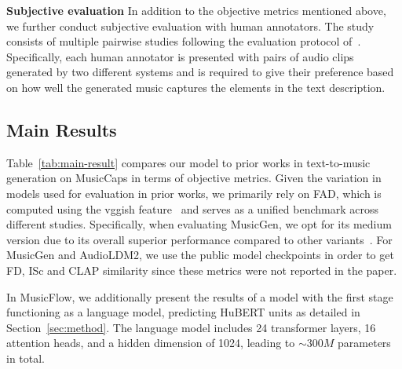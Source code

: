 
\textbf{Subjective evaluation} In addition to the objective metrics mentioned above, we further conduct subjective evaluation with human annotators. The study consists of multiple pairwise studies following the evaluation protocol of~\citet{musiclm}. Specifically, each human annotator is presented with pairs of audio clips generated by two different systems and is required to give their preference based on how well the generated music captures the elements in the text description. 

\subsection{Main Results}\label{sec:main-result}

Table~\ref{tab:main-result} compares our model to prior works in text-to-music generation on MusicCaps in terms of objective metrics. 
Given the variation in models used for evaluation in prior works, we primarily rely on FAD, which is computed using the vggish feature~\cite{Kilgour2019FrchetAD} and serves as a unified benchmark across different studies. Specifically, when evaluating MusicGen, we opt for its medium version due to its overall superior performance compared to other variants~\cite{musicgen}. For MusicGen and AudioLDM2, we use the public model checkpoints in order to get FD, ISc and CLAP similarity since these metrics were not reported in the paper. 

In MusicFlow, we additionally present the results of a model with the first stage functioning as a language model, predicting HuBERT units as detailed in Section~\ref{sec:method}. The language model includes 24 transformer layers, 16 attention heads, and a hidden dimension of 1024, leading to $\sim300M$ parameters in total.

